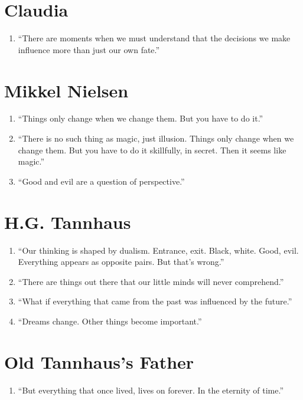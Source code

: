 \documentclass{book}
\numberwithin{equation}{section}
\begin{document}
\section{Claudia}
\begin{enumerate}
    \item ``There are moments when we must understand that the decisions we make influence more than just our own fate.''
\end{enumerate}

\section{Mikkel Nielsen}
\begin{enumerate}
    \item ``Things only change when we change them. But you have to do it.''
    \item ``There is no such thing as magic, just illusion. Things only change when we change them. But you have to do it skillfully, in secret. Then it seems like magic.''
    \item ``Good and evil are a question of perspective.''
\end{enumerate}

\section{H.G. Tannhaus}
\begin{enumerate}
    \item``Our thinking is shaped by dualism. Entrance, exit. Black, white. Good, evil. Everything appears as opposite pairs. But that's wrong.''
    \item ``There are things out there that our little minds will never comprehend.''
    \item ``What if everything that came from the past was influenced by the future.''
    \item ``Dreams change. Other things become important.''
\end{enumerate}

\section{Old Tannhaus's Father}
\begin{enumerate}
    \item ``But everything that once lived, lives on forever. In the eternity of time.''
\end{enumerate}
\end{document}
